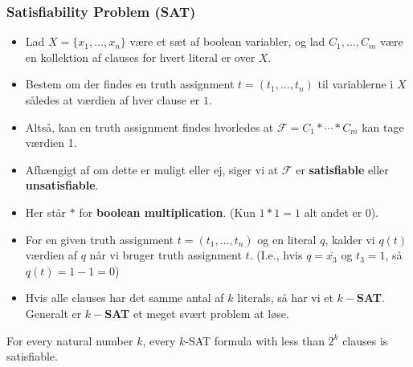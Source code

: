 \documentclass{beamer}
\begin{document}
\begin{frame}[allowframebreaks]
  \frametitle{Satisfiability Problem (SAT)}
  \begin{itemize}
  \item Lad $X = \{x_{1}, \ldots, x_{n}\}$ være et sæt af boolean variabler, og lad $C_{1}, \ldots, C_{m}$ være en kollektion af clauses for hvert literal er over $X$. 
  \item Bestem om der findes en truth assignment $t = (t_{1}, \ldots, t_{n})$ til variablerne i $X$ således at værdien af hver clause er $1$. 
  \item Altså, kan en truth assignment findes hvorledes at $\mathcal{F} = C_{1} * \cdots * C_{m}$ kan tage værdien 1. 
  \item Afhængigt af om dette er muligt eller ej, siger vi at $\mathcal{F}$ er \textbf{satisfiable} eller \textbf{unsatisfiable}. 
  \item Her står $*$ for \textbf{boolean multiplication}. (Kun $1 * 1 = 1$ alt andet er 0).
  \item For en given truth assignment $t = (t_{1}, \ldots, t_{n})$ og en literal $q$, kalder vi $q(t)$  værdien af $q$ når vi bruger truth assignment $t$. (I.e., hvis $q = \overline{x_{3}}$ og $t_{3} = 1$, så $q(t) = 1-1=0$)
  \item Hvis alle clauses har det samme antal af $k$ literals, så har vi et $k-$\textbf{SAT}. Generalt er $k-$\textbf{SAT} et meget svært problem at løse.
  \end{itemize}

  \begin{theorem}[A]
For every natural number $k$, every $k$-SAT formula with less than $2^{k}$ clauses is satisfiable. 
  \end{theorem}


\end{frame}
\end{document}
